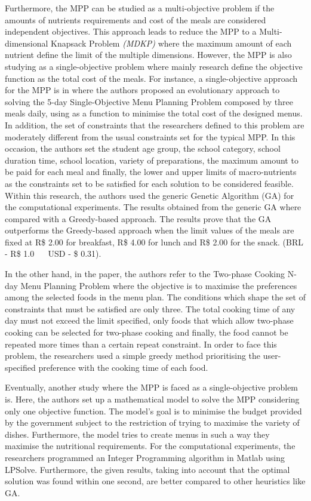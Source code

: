 Furthermore, the MPP can be studied as a multi-objective problem\cite{Seljak2009, Moreira2018} if the amounts of nutrients requirements and cost of the meals are considered independent objectives. This approach leads to reduce the MPP to a Multi-dimensional Knapsack Problem \textit{(MDKP)} where the maximum amount of each nutrient define the limit of the multiple dimensions. However, the MPP is also studying as a single-objective problem where mainly research define the objective function as the total cost of the meals. For instance, a single-objective approach for the MPP is in\cite{Moreira2018} where the authors proposed an evolutionary approach to solving the 5-day Single-Objective Menu Planning Problem composed by three meals daily, using as a function to minimise the total cost of the designed menus. In addition, the set of constraints that the researchers defined to this problem are moderately different from the usual constraints set for the typical MPP. In this occasion, the authors set the student age group, the school category, school duration time, school location, variety of preparations, the maximum amount to be paid for each meal and finally, the lower and upper limits of macro-nutrients as the constraints set to be satisfied for each solution to be considered feasible. Within this research, the authors used the generic Genetic Algorithm (GA) for the computational experiments. The results obtained from the generic GA where compared with a Greedy-based approach. The results prove that the GA outperforms the Greedy-based approach when the limit values of the meals are fixed at R\$ 2.00 for breakfast, R\$ 4.00 for lunch and R\$ 2.00 for the snack. (BRL - R\$ 1.0 ~~ USD - \$ 0.31).

In the other hand, in the paper\cite{Funabiki2011}, the authors refer to the Two-phase Cooking N-day Menu Planning Problem where the objective is to maximise the preferences among the selected foods in the menu plan. The conditions which shape the set of constraints that must be satisfied are only three. The total cooking time of any day must not exceed the limit specified, only foods that which allow two-phase cooking can be selected for two-phase cooking and finally, the food cannot be repeated more times than a certain repeat constraint. In order to face this problem, the researchers used a simple greedy method prioritising the user-specified preference with the cooking time of each food.

Eventually, another study where the MPP is faced as a single-objective problem is\cite{Sufahani2014}. Here, the authors set up a mathematical model to solve the MPP considering only one objective function. The model's goal is to minimise the budget provided by the government subject to the restriction of trying to maximise the variety of dishes. Furthermore, the model tries to create menus in such a way they maximise the nutritional requirements. For the computational experiments, the researchers programmed an Integer Programming algorithm in Matlab using LPSolve. Furthermore, the given results, taking into account that the optimal solution was found within one second, are better compared to other heuristics like GA.

